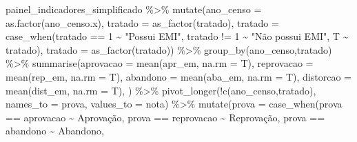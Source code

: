 \documentclass[
  letterpaper,
  DIV=11,
  numbers=noendperiod]{scrartcl}
\newenvironment{Shaded}{\begin{snugshade}}{\end{snugshade}}
\newcommand{\AttributeTok}[1]{\textcolor[rgb]{0.40,0.45,0.13}{#1}}
\newcommand{\DecValTok}[1]{\textcolor[rgb]{0.68,0.00,0.00}{#1}}
\newcommand{\FunctionTok}[1]{\textcolor[rgb]{0.28,0.35,0.67}{#1}}
\newcommand{\NormalTok}[1]{\textcolor[rgb]{0.00,0.23,0.31}{#1}}
\newcommand{\SpecialCharTok}[1]{\textcolor[rgb]{0.37,0.37,0.37}{#1}}
\newcommand{\StringTok}[1]{\textcolor[rgb]{0.13,0.47,0.30}{#1}}
\begin{document}
\begin{Shaded}
\begin{Highlighting}[]
\NormalTok{painel\_indicadores\_simplificado }\SpecialCharTok{\%\textgreater{}\%} 
  \FunctionTok{mutate}\NormalTok{(}\AttributeTok{ano\_censo =} \FunctionTok{as.factor}\NormalTok{(ano\_censo.x),}
         \AttributeTok{tratado =} \FunctionTok{as\_factor}\NormalTok{(tratado),}
         \AttributeTok{tratado =} \FunctionTok{case\_when}\NormalTok{(tratado }\SpecialCharTok{==} \DecValTok{1} \SpecialCharTok{\textasciitilde{}} \StringTok{"Possui EMI"}\NormalTok{,}
\NormalTok{                             tratado }\SpecialCharTok{!=} \DecValTok{1} \SpecialCharTok{\textasciitilde{}} \StringTok{"Não possui EMI"}\NormalTok{,}
\NormalTok{                             T }\SpecialCharTok{\textasciitilde{}}\NormalTok{ tratado),}
         \AttributeTok{tratado =} \FunctionTok{as\_factor}\NormalTok{(tratado)) }\SpecialCharTok{\%\textgreater{}\%} 
  \FunctionTok{group\_by}\NormalTok{(ano\_censo,tratado) }\SpecialCharTok{\%\textgreater{}\%} 
  \FunctionTok{summarise}\NormalTok{(}\AttributeTok{aprovacao =} \FunctionTok{mean}\NormalTok{(apr\_em, }\AttributeTok{na.rm =}\NormalTok{ T),}
            \AttributeTok{reprovacao =} \FunctionTok{mean}\NormalTok{(rep\_em, }\AttributeTok{na.rm =}\NormalTok{ T),}
            \AttributeTok{abandono =} \FunctionTok{mean}\NormalTok{(aba\_em, }\AttributeTok{na.rm =}\NormalTok{ T),}
            \AttributeTok{distorcao =} \FunctionTok{mean}\NormalTok{(dist\_em, }\AttributeTok{na.rm =}\NormalTok{ T),}
\NormalTok{            ) }\SpecialCharTok{\%\textgreater{}\%}
\FunctionTok{pivot\_longer}\NormalTok{(}\SpecialCharTok{!}\FunctionTok{c}\NormalTok{(ano\_censo,tratado), }
             \AttributeTok{names\_to =} \StringTok{\textquotesingle{}prova\textquotesingle{}}\NormalTok{,}
             \AttributeTok{values\_to =} \StringTok{\textquotesingle{}nota\textquotesingle{}}\NormalTok{) }\SpecialCharTok{\%\textgreater{}\%} 
\FunctionTok{mutate}\NormalTok{(}\AttributeTok{prova =} \FunctionTok{case\_when}\NormalTok{(prova }\SpecialCharTok{==} \StringTok{\textquotesingle{}aprovacao\textquotesingle{}} \SpecialCharTok{\textasciitilde{}} \StringTok{\textquotesingle{}Aprovação\textquotesingle{}}\NormalTok{,}
\NormalTok{                         prova }\SpecialCharTok{==} \StringTok{\textquotesingle{}reprovacao\textquotesingle{}} \SpecialCharTok{\textasciitilde{}} \StringTok{\textquotesingle{}Reprovação\textquotesingle{}}\NormalTok{,}
\NormalTok{                         prova }\SpecialCharTok{==} \StringTok{\textquotesingle{}abandono\textquotesingle{}} \SpecialCharTok{\textasciitilde{}} \StringTok{\textquotesingle{}Abandono\textquotesingle{}}\NormalTok{,}

\end{Highlighting}
\end{Shaded}
\end{document}
